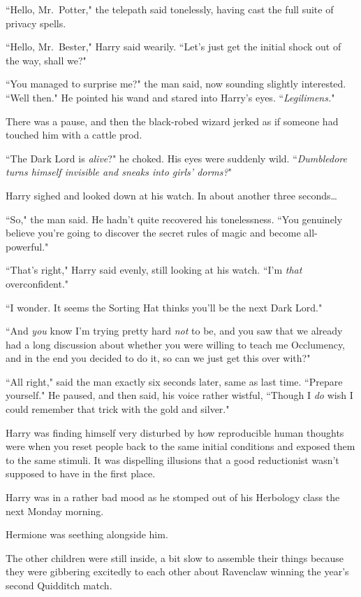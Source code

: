 ``Hello, Mr.~Potter," the telepath said tonelessly, having cast the full suite of privacy spells.

``Hello, Mr.~Bester," Harry said wearily. ``Let's just get the initial shock out of the way, shall we?"

``You managed to surprise me?" the man said, now sounding slightly interested. ``Well then." He pointed his wand and stared into Harry's eyes. ``\emph{Legilimens.}"

There was a pause, and then the black-robed wizard jerked as if someone had touched him with a cattle prod.

``The Dark Lord is \emph{alive}?" he choked. His eyes were suddenly wild. ``\emph{Dumbledore turns himself invisible and sneaks into girls' dorms?}"

Harry sighed and looked down at his watch. In about another three seconds{\ldots}

``So," the man said. He hadn't quite recovered his tonelessness. ``You genuinely believe you're going to discover the secret rules of magic and become all-powerful."

``That's right," Harry said evenly, still looking at his watch. ``I'm \emph{that} overconfident."

``I wonder. It seems the Sorting Hat thinks you'll be the next Dark Lord."

``And \emph{you} know I'm trying pretty hard \emph{not} to be, and you saw that we already had a long discussion about whether you were willing to teach me Occlumency, and in the end you decided to do it, so can we just get this over with?"

``All right," said the man exactly six seconds later, same as last time. ``Prepare yourself." He paused, and then said, his voice rather wistful, ``Though I \emph{do} wish I could remember that trick with the gold and silver."

Harry was finding himself very disturbed by how reproducible human thoughts were when you reset people back to the same initial conditions and exposed them to the same stimuli. It was dispelling illusions that a good reductionist wasn't supposed to have in the first place.

\later

Harry was in a rather bad mood as he stomped out of his Herbology class the next Monday morning.

Hermione was seething alongside him.

The other children were still inside, a bit slow to assemble their things because they were gibbering excitedly to each other about Ravenclaw winning the year's second Quidditch match.

